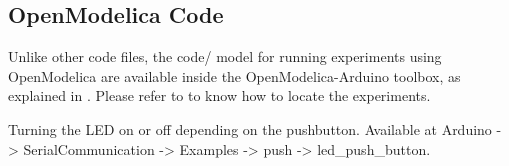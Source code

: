 \subsection{OpenModelica Code}
Unlike other code files, the code/ model for running experiments using OpenModelica are 
available inside the OpenModelica-Arduino toolbox, as explained in .
Please refer to  to know how to locate the experiments. 
\label{sec:led-OpenModelica-code}

\begin{OpenModelicacode}
\label{OpenModelica:push-100}

\end{OpenModelicacode}

\begin{OpenModelicacode}
  {Turning the LED on or off depending on the pushbutton.  Available at Arduino -> SerialCommunication -> 
  Examples -> push -> led\_push\_button.}
\label{OpenModelica:push-200}

\end{OpenModelicacode}
